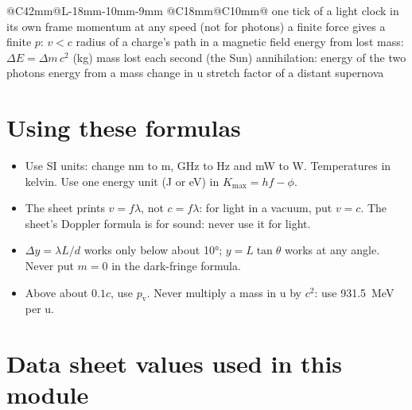 {\begin{longtable}{@{}C{42mm}@{\hspace{3mm}}L{\dimexpr\linewidth-42mm-18mm-10mm-9mm\relax}%
    @{\hspace{3mm}}C{18mm}@{\hspace{3mm}}C{10mm}@{}}
    {one tick of a light clock in its own frame}{}
    {momentum at any speed (not for photons)}{}
    {a finite force gives a finite $p$: $v < c$}{}
    {radius of a charge's path in a magnetic field}{}
    {energy from lost mass: $\Delta E = \Delta m\,c^2$ (kg)}{}
    {mass lost each second (the Sun)}{}
    {annihilation: energy of the two photons}{}
    {energy from a mass change in \si{\amu}}{}
    {stretch factor of a distant supernova}{}
\end{longtable}}

\section*{Using these formulas}

\begin{itemize}
  \item Use SI units: change \si{nm} to \si{m}, \si{GHz} to \si{Hz} and \si{mW} to \si{W}.
        Temperatures in kelvin. Use one energy unit (J or eV) in $K_\mathrm{max} = hf - \phi$.
  \item The sheet prints $v = f\lambda$, not $c = f\lambda$: for light in a vacuum, put $v = c$.
        The sheet's Doppler formula is for sound: never use it for light.
  \item $\Delta y = \lambda L/d$ works only below about \ang{10}; $y = L\tan\theta$ works
        at any angle. Never put $m = 0$ in the dark-fringe formula.
  \item Above about $0.1c$, use $p_\mathrm{v}$. Never multiply a mass in \si{\amu} by $c^2$:
        use \qty{931.5}{\mega\eV} per \si{\amu}.
\end{itemize}

\section*{Data sheet values used in this module}

